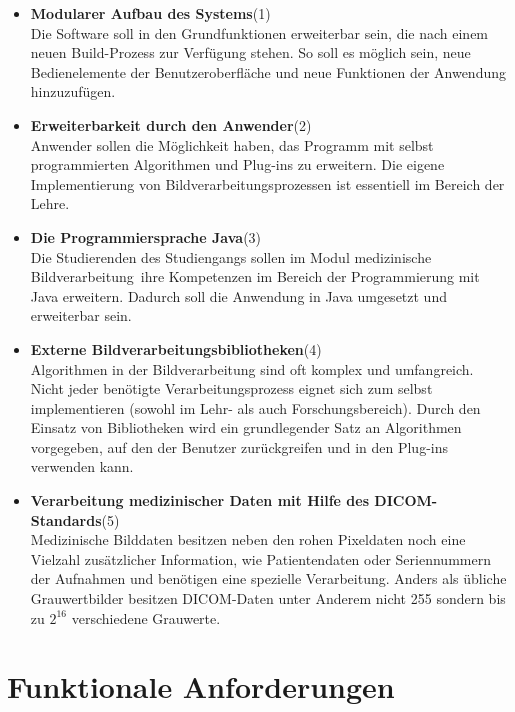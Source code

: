 \begin{itemize}
\item  \textbf{Modularer Aufbau des Systems}(1)\\
	  Die Software soll in den Grundfunktionen erweiterbar sein, die nach einem neuen Build-Prozess zur Verfügung stehen. So soll es möglich sein, neue Bedienelemente der Benutzeroberfläche und neue Funktionen der Anwendung hinzuzufügen.
	  
\item \textbf{Erweiterbarkeit durch den Anwender}(2)\\
	Anwender sollen die Möglichkeit haben, das Programm mit selbst programmierten Algorithmen und Plug-ins zu erweitern. Die eigene Implementierung von Bildverarbeitungsprozessen ist essentiell im Bereich der Lehre.
	
\item \textbf{Die Programmiersprache Java}(3)\\
	Die Studierenden des Studiengangs sollen im Modul \glqq medizinische Bildverarbeitung\grqq\ ihre Kompetenzen im Bereich der Programmierung mit Java erweitern. Dadurch soll die Anwendung in Java umgesetzt und erweiterbar sein.
	
\item \textbf{Externe Bildverarbeitungsbibliotheken}(4)\\
	Algorithmen in der Bildverarbeitung sind oft komplex und umfangreich. Nicht jeder benötigte Verarbeitungsprozess eignet sich zum selbst implementieren (sowohl im Lehr- als auch Forschungsbereich). Durch den Einsatz von Bibliotheken wird ein grundlegender Satz an Algorithmen vorgegeben, auf den der Benutzer zurückgreifen und in den Plug-ins verwenden kann.
	
\item \textbf{Verarbeitung medizinischer Daten mit Hilfe des DICOM-Standards}(5)\\
	Medizinische Bilddaten besitzen neben den rohen Pixeldaten noch eine Vielzahl zusätzlicher Information, wie Patientendaten oder Seriennummern der Aufnahmen und benötigen eine spezielle Verarbeitung. Anders als übliche Grauwertbilder besitzen DICOM-Daten unter Anderem nicht 255 sondern bis zu $2^{16}$ verschiedene Grauwerte.
\end{itemize}

\section{Funktionale Anforderungen}

